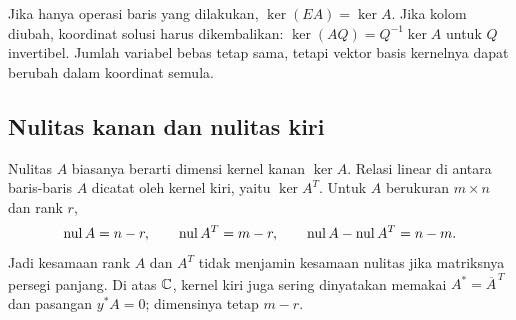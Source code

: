 Jika hanya operasi baris yang dilakukan, $\ker(EA)=\ker A$.
Jika kolom diubah, koordinat solusi harus dikembalikan:
$\ker(AQ)=Q^{-1}\ker A$ untuk $Q$ invertibel.
Jumlah variabel bebas tetap sama, tetapi vektor basis kernelnya
dapat berubah dalam koordinat semula.

\subsection{Nulitas kanan dan nulitas kiri}

Nulitas $A$ biasanya berarti dimensi kernel kanan $\ker A$.
Relasi linear di antara baris-baris $A$ dicatat oleh kernel kiri,
yaitu $\ker A^T$. Untuk $A$ berukuran $m\times n$ dan rank $r$,
\[
    \operatorname{nul} A=n-r,\qquad \operatorname{nul} A^T=m-r,\qquad
    \operatorname{nul} A-\operatorname{nul} A^T=n-m.
\]
Jadi kesamaan rank $A$ dan $A^T$ tidak menjamin kesamaan nulitas
jika matriksnya persegi panjang. Di atas $\mathbb{C}$, kernel kiri juga
sering dinyatakan memakai $A^*=\overline A^{\,T}$ dan pasangan $y^*A=0$;
dimensinya tetap $m-r$.

